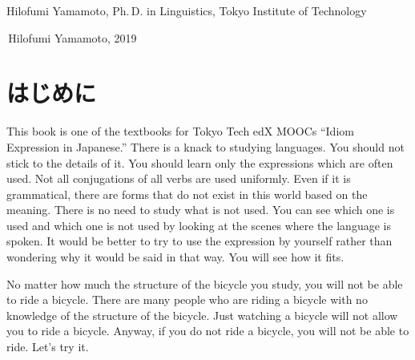 \documentclass[
uplatex,
b5paper,
10pt,
dvipdfmx
]{jsbook}
\newif\ifEnglish
\newif\ifPreface
\begin{document}
Hilofumi Yamamoto, Ph.\,D. in Linguistics, Tokyo Institute of Technology

\textcopyright\,Hilofumi Yamamoto, 2019


\ifPreface
\ifEnglish
\chapter*{Preface}
\else
\chapter*{はじめに}
\fi

\ifEnglish

This book is one of the textbooks for Tokyo Tech edX MOOCs ``Idiom Expression in Japanese.''
There is a knack to studying languages.
You should not stick to the details of it.
You should learn only the expressions which are often used.
Not all conjugations of all verbs are used uniformly.
Even if it is grammatical, there are forms that do not exist in this world based on the meaning.
There is no need to study what is not used.
You can see which one is used and which one is not used by looking at the scenes where the language is spoken.
It would be better to try to use the expression by yourself rather than wondering why it would be said in that way.
You will see how it fits.

No matter how much the structure of the bicycle you study, you will not be able to ride a bicycle.
There are many people who are riding a bicycle with no knowledge of the structure of the bicycle.
Just watching a bicycle will not allow you to ride a bicycle.
Anyway, if you do not ride a bicycle, you will not be able to ride.
Let's try it.
\end{document}
